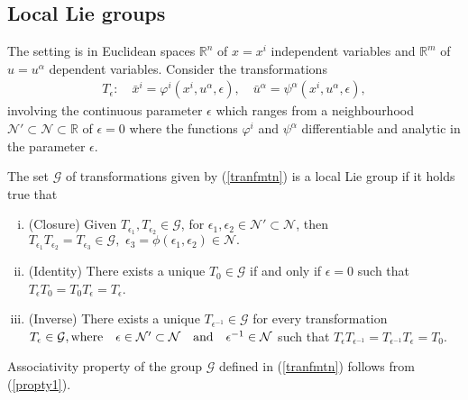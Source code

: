 \subsection{Local Lie groups}
The setting is in Euclidean spaces $\mathbb{R}^n$ of $x=x^i$ independent variables and  $\mathbb{R}^m$ of $ u=u^{\alpha}$  dependent variables. Consider the transformations
\begin{align}
T_{\epsilon}: \quad \bar{x}^i = \varphi^i(x^i,u^{\alpha},\epsilon ), \quad \bar{u}^{\alpha } =\psi^{\alpha}(x^i,u^{\alpha},\epsilon), \label{tranfmtn}
\end{align} involving  the continuous  parameter $\epsilon$ which ranges from a neighbourhood $ \mathcal{N}' \subset \mathcal{N} \subset \mathbb{R}$ of $ \epsilon=0 $ where  the functions $ \varphi^i$ and $ \psi^{\alpha}$ differentiable and analytic in the parameter $\epsilon$.
\begin{defn} The set $\mathcal{G}$  of transformations given by  (\ref{tranfmtn}) is a local Lie group if it holds true that
	\begin{enumerate}[(i)]
		\item (Closure) Given \label{propty1} $T_{\epsilon_1},T_{\epsilon_2}  \in \mathcal{G}$, for $\epsilon_1,\epsilon_2 \in  \mathcal{N}' \subset \mathcal{N} $, then $T_{\epsilon_1}T_{\epsilon_2} = T_{\epsilon_3} \in \mathcal{G},\,\,  \epsilon_3= \phi( \epsilon_1,\epsilon_2) \in \mathcal{N}.$	
		\item (Identity) There exists a unique  $  T_0 \in \mathcal{G} $ if and only if $ \epsilon=0$ such that $ T_{\epsilon}T_{0}=T_{0}T_{\epsilon}=T_{\epsilon}$.
		\item (Inverse) There  exists a unique $T_{\epsilon^{-1}} \in \mathcal{G}$ for every transformation $ T_{\epsilon} \in \mathcal{G}, \quad \newline \text{where} \quad \epsilon \in  
		\mathcal{N}' \subset  \mathcal{N}
		 \quad \text{and} \quad  \epsilon^{-1} \in \mathcal{N}
		 $ such that $ T_{\epsilon} T_{\epsilon^{-1}}=T_{\epsilon^{-1}}T_{\epsilon}=T_{0}$.
	\end{enumerate}
\begin{rem}
Associativity property of the group $\mathcal{G} $  defined in (\ref{tranfmtn}) follows from (\ref{propty1}).
\end{rem}
\end{defn}
